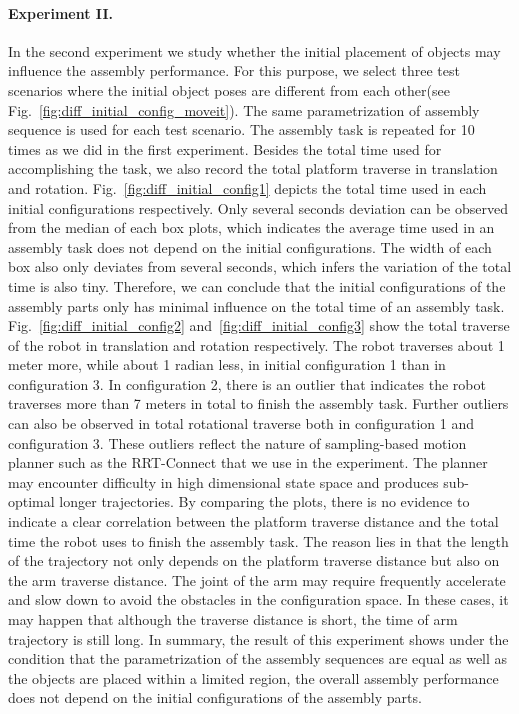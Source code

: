 \paragraph{Experiment II.} In the second experiment we study whether the initial placement of objects may influence the assembly performance. For this purpose, we select three test scenarios where the initial object poses are different from each other(see Fig.~\ref{fig:diff_initial_config_moveit}). The same parametrization of assembly sequence is used for each test scenario. The assembly task is repeated for 10 times as we did in the first experiment. Besides the total time used for accomplishing the task, we also record the total platform traverse in translation and rotation. Fig.~\ref{fig:diff_initial_config1} depicts the total time used in each initial configurations respectively. Only several seconds deviation can be observed from the median of each box plots, which indicates the average time used in an assembly task does not depend on the initial configurations. The width of each box also only deviates from several seconds, which infers the variation of the total time is also tiny. Therefore, we can conclude that the initial configurations of the assembly parts only has minimal influence on the total time of an assembly task. Fig.~\ref{fig:diff_initial_config2} and~\ref{fig:diff_initial_config3} show the total traverse of the robot in translation and rotation respectively. The robot traverses about 1 meter more, while about 1 radian less, in initial configuration 1 than in configuration 3. In configuration 2, there is an outlier that indicates the robot traverses more than 7 meters in total to finish the assembly task. Further outliers can also be observed in total rotational traverse both in configuration 1 and configuration 3. These outliers reflect the nature of sampling-based motion planner such as the RRT-Connect that we use in the experiment. The planner may encounter difficulty in high dimensional state space and produces sub-optimal longer trajectories. By comparing the plots, there is no evidence to indicate a clear correlation between the platform traverse distance and the total time the robot uses to finish the assembly task. The reason lies in that the length of the trajectory not only depends on the platform traverse distance but also on the arm traverse distance. The joint of the arm may require frequently accelerate and slow down to avoid the obstacles in the configuration space. In these cases, it may happen that although the traverse distance is short, the time of arm trajectory is still long. In summary, the result of this experiment shows under the condition that the parametrization of the assembly sequences are equal as well as the objects are placed within a limited region, the overall assembly performance does not depend on the initial configurations of the assembly parts.  

